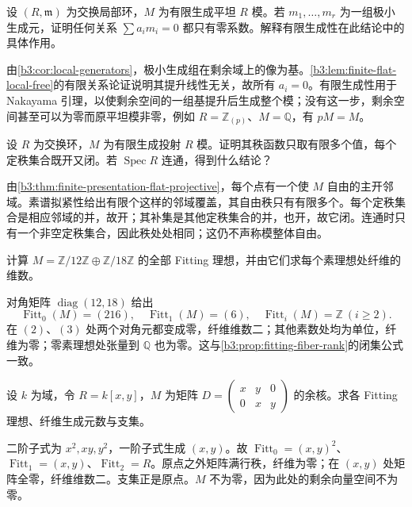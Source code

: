 \begin{exercise}\label{b3:ex:12-finite-local-relation}
	设 \((R,\mathfrak m)\) 为交换局部环，\(M\) 为有限生成平坦 \(R\) 模。若 \(m_1,\ldots,m_r\) 为一组极小生成元，证明任何关系 \(\sum a_im_i=0\) 都只有零系数。解释有限生成性在此结论中的具体作用。
\end{exercise}
\begin{solution}
	由\cref{b3:cor:local-generators}，极小生成组在剩余域上的像为基。\cref{b3:lem:finite-flat-local-free}的有限关系论证说明其提升线性无关，故所有 \(a_i=0\)。有限生成性用于 Nakayama 引理，以使剩余空间的一组基提升后生成整个模；没有这一步，剩余空间甚至可以为零而原平坦模非零，例如 \(R=\mathbb Z_{(p)}\)、\(M=\mathbb Q\)，有 \(pM=M\)。
\end{solution}

\begin{exercise}\label{b3:ex:12-projective-rank-clopen}
	设 \(R\) 为交换环，\(M\) 为有限生成投射 \(R\) 模。证明其秩函数只取有限多个值，每个定秩集合既开又闭。若 \(\operatorname{Spec}R\) 连通，得到什么结论？
\end{exercise}
\begin{solution}
	由\cref{b3:thm:finite-presentation-flat-projective}，每个点有一个使 \(M\) 自由的主开邻域。素谱拟紧性给出有限个这样的邻域覆盖，其自由秩只有有限多个。每个定秩集合是相应邻域的并，故开；其补集是其他定秩集合的并，也开，故它闭。连通时只有一个非空定秩集合，因此秩处处相同；这仍不声称模整体自由。
\end{solution}

\begin{exercise}\label{b3:ex:12-fittings-integer}
	计算 \(M=\mathbb Z/12\mathbb Z\oplus\mathbb Z/18\mathbb Z\) 的全部 Fitting 理想，并由它们求每个素理想处纤维的维数。
\end{exercise}
\begin{solution}
	对角矩阵 \(\operatorname{diag}(12,18)\) 给出
	\[
		\operatorname{Fitt}_0(M)=(216),\quad \operatorname{Fitt}_1(M)=(6),\quad \operatorname{Fitt}_i(M)=\mathbb Z\ (i\ge2).
	\]
	在 \((2)\)、\((3)\) 处两个对角元都变成零，纤维维数二；其他素数处均为单位，纤维为零；零素理想处张量到 \(\mathbb Q\) 也为零。这与\cref{b3:prop:fitting-fiber-rank}的闭集公式一致。
\end{solution}

\begin{exercise}\label{b3:ex:12-fittings-three-generators}
	设 \(k\) 为域，令 \(R=k[x,y]\)，\(M\) 为矩阵
	\(D=\begin{pmatrix}x&y&0\\0&x&y\end{pmatrix}\)
	的余核。求各 Fitting 理想、纤维生成元数与支集。
\end{exercise}
\begin{solution}
	二阶子式为 \(x^2,xy,y^2\)，一阶子式生成 \((x,y)\)。故 \(\operatorname{Fitt}_0=(x,y)^2\)、\(\operatorname{Fitt}_1=(x,y)\)、\(\operatorname{Fitt}_2=R\)。原点之外矩阵满行秩，纤维为零；在 \((x,y)\) 处矩阵全零，纤维维数二。支集正是原点。\(M\) 不为零，因为此处的剩余向量空间不为零。
\end{solution}

